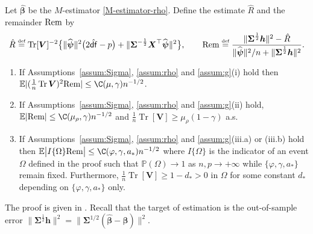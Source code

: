 \documentclass[11pt]{amsart}
\numberwithin{equation}{section}
\numberwithin{equation}{section}
\def\constants{\gamma,\mu,\mu_g,\varphi,a_*}
\def\E{{\mathbb{E}}}
\def\P{{\mathbb{P}}}
\def\Rem{\hbox{\rm Rem}}
\DeclareMathOperator{\trace}{Tr}
\def\mathbold{\boldsymbol} %
\def\bh{\mathbold{h}}\def\hhat{\widehat{h}}\def\htil{\widetilde{h}}
\def\bV{\mathbold{V}}\def\hbV{{\widehat{\bV}}}\def\tbV{{\widetilde{\bV}}}
\def\bX{\mathbold{X}}\def\hbX{{\widehat{\bX}}}\def\tbX{{\widetilde{\bX}}}\def\bXbar{{\overline \bX}}
\def\by{\mathbold{y}}\def\yhat{\widehat{y}}\def\ytil{\widetilde{y}}\def\ybar{{\overline y}}\def\vby{{\bf y}}
\def\bbeta{\mathbold{\beta}}\def\betahat{\widehat{\beta}}\def\hbeta{\widehat{\beta}}
\def\hbbeta{{{\widehat{\bbeta}}}}
\def\bSigma{\mathbold{\Sigma}}\def\hbSigma{{\widehat{\bSigma}}}
\def\bpsi{\mathbold{\psi}}\def\psihat{\widehat{\psi}}\def\hpsi{\widehat{\psi}}
\def\hbpsi{{\widehat{\bpsi}}}\def\tbpsi{{\widetilde{\bpsi}}}
\def\defas{\stackrel{\text{\tiny def}}{=}}
\def\df{{\hat{\mathsf{df}}}{}}
\newcommand\pb[1]{{ #1 }}
\begin{document}
\begin{theorem}
    \label{thm:main_robust}
    \pb{
    Let $\hbbeta$ be the $M$-estimator \eqref{M-estimator-rho}.
    Define the estimate $\hat R$ and the remainder $\Rem$ by
    \begin{equation}
\label{eq:hat-R}
\hat R
\defas
\trace[\bV]^{-2}\bigl\{ \|\hbpsi\|^2
    \bigl(2\pb{\df}-p\bigr)
+ \|\bSigma^{-\frac12}\bX^\top\hbpsi\|^2\bigr\},
\qquad
    \Rem
    \defas
\frac{ 
\|\bSigma^{\frac12}\bh\|^2 -\hat R
}{
 \|\hbpsi\|^2/n + \|\bSigma^{\frac12}\bh\|^2
}
.
\end{equation}

\begin{enumerate}
\item
    If Assumptions~\ref{assum:Sigma}, \ref{assum:rho}
    and \ref{assum:g}(i) hold then
$\E|
(\frac 1 n \trace \bV)^{2}
\Rem
|
\le
\C(\mu,\gamma) n^{-1/2}$.

\item
    If Assumptions~\ref{assum:Sigma}, \ref{assum:rho}
    and \ref{assum:g}(ii) hold,
$\E|
\Rem|
\le
\C(\mu_\rho,\gamma) n^{-1/2}$
and
$\frac 1 n
    \trace[\bV]\ge \mu_\rho( 1-\gamma )$
    a.s.
\item
    If Assumptions~\ref{assum:Sigma}, \ref{assum:rho}
    and \ref{assum:g}(iii.a) or (iii.b) hold then
$\E\big|
I \{\Omega\}
\Rem
\big|
\le
\C(\varphi,\gamma,a_*) n^{-1/2}$
where $I \{\Omega\}$ is the indicator of an event $\Omega$ defined in the proof such that $\mathbb P(\Omega)\to 1$  as $n,p\to+\infty$ while $\{\varphi,\gamma,a_*\}$ remain fixed.
Furthermore, $\frac 1 n \trace[\bV]\ge 1-d_* >0$ in $\Omega$ for some constant $d_*$ depending on $\{\varphi,\gamma,a_*\}$ only.
\end{enumerate}
}
%
\end{theorem}
The proof is given in .
Recall that the target of estimation is the 
out-of-sample error $\|\bSigma^{\frac12}\bh\|^2=\|\bSigma^{1/2}(\hbbeta-\bbeta)\|^2$.
\end{document}
